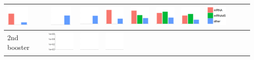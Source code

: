 \begin{table}
{\begin{tabular}{ | p{} | c  c  c  c | c  c  c  c  c | c | }
\includegraphics[height=1.1cm]{images/graph_07_inf_03.png} &
\includegraphics[height=1.1cm]{images/graph_07_inf_04.png} &
\includegraphics[height=1.1cm]{images/graph_07_inf_05.png} &
\includegraphics[height=1.1cm]{images/graph_07_inf_06.png} &
\includegraphics[height=1.1cm]{images/graph_07_inf_07.png} &
\includegraphics[height=1.1cm]{images/graph_07_inf_08.png} &
\includegraphics[height=1.1cm]{images/graph_07_inf_09.png} &
\includegraphics[height=1.1cm]{images/graph_06_legend.png}
\\
 \hline
2nd booster    & 
\includegraphics[height=1.1cm]{images/graph_08_inf_01_with_scale.png} & 
\includegraphics[height=1.1cm]{images/graph_08_inf_02.png} &
\includegraphics[height=1.1cm]{images/graph_08_inf_03.png} &

\end{tabular}}
\end{table}
